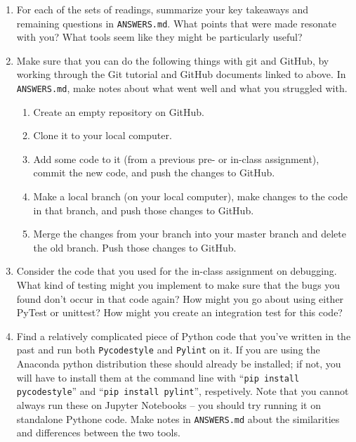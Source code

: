 \documentclass[10pt]{article}
\begin{document}
\begin{enumerate}

  \item For each of the sets of readings, summarize your key
    takeaways and remaining questions in \texttt{ANSWERS.md}.  What
    points that were made resonate with you?  What tools seem like
    they might be particularly useful?
  
  \item Make sure that you can do the following things with git and
  GitHub, by working through the Git tutorial and GitHub documents
  linked to above.  In \texttt{ANSWERS.md}, make notes about what went well and
  what you struggled with.  

  \begin{enumerate}

  \item Create an empty repository on GitHub.
  \item Clone it to your local computer.
  \item Add some code to it (from a previous pre- or in-class
    assignment), commit the new code, and push the changes to GitHub.
  \item Make a local branch (on your local computer), make changes to
    the code in
    that branch, and push those changes to GitHub.
  \item Merge the changes from your branch into your master branch and
    delete the old branch.  Push those changes to GitHub.
  \end{enumerate}



  \item Consider the code that you used for the in-class assignment on
    debugging.  What kind of testing might you implement to make sure
    that the bugs you found don't occur in that code again?  How might
    you go about using either PyTest or unittest?  How might you
    create an integration test for this code?

  \item Find a relatively complicated piece of Python code that you've
    written in the past and run both \texttt{Pycodestyle} and
    \texttt{Pylint} on it.  If you are using the Anaconda python
    distribution these should already be installed; if not, you will
    have to install them at the command line with ``\texttt{pip
      install pycodestyle}'' and ``\texttt{pip install pylint}'',
    respetively.  Note that you cannot always run these on Jupyter Notebooks
    -- you should try running it on standalone Pythone code.  Make
    notes in \texttt{ANSWERS.md} about the similarities and
    differences between the two tools.


\end{enumerate}
\end{document}
